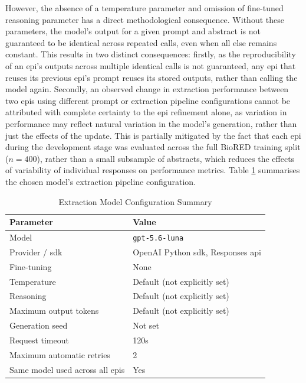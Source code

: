 However, the absence of a temperature parameter and omission of fine-tuned reasoning parameter has a direct methodological consequence. Without these parameters, the model's output for a given prompt and abstract is not guaranteed to be identical across repeated calls, even when all else remains constant. This results in two distinct consequences: firstly, as the reproducibility of an \gls{epi}'s outputs across multiple identical calls is not guaranteed, any \gls{epi} that reuses its previous \gls{epi}'s prompt reuses its stored outputs, rather than calling the model again. Secondly, an observed change in extraction performance between two \gls{epi}s using different prompt or extraction pipeline configurations cannot be attributed with complete certainty to the \gls{epi} refinement alone, as variation in performance may reflect natural variation in the model's generation, rather than just the effects of the update. This is partially mitigated by the fact that each \gls{epi} during the development stage was evaluated across the full BioRED training split ($n = 400$), rather than a small subsample of abstracts, which reduces the effects of variability of individual responses on performance metrics. Table \ref{tab:extraction_model_config_summary} summarises the chosen model's extraction pipeline configuration.

\begin{table}[H]
    \centering
    \caption{Extraction Model Configuration Summary}
    \label{tab:extraction_model_config_summary}
    \begin{tabularx}{\textwidth}{l l}
        \toprule
        Parameter & Value \\
        \midrule
        Model & \verb|gpt-5.6-luna| \\
        Provider / \gls{sdk} & OpenAI Python \gls{sdk}, Responses \gls{api} \\
        Fine-tuning & None \\
        Temperature & Default (not explicitly set) \\
        Reasoning & Default (not explicitly set) \\
        Maximum output tokens & Default (not explicitly set) \\
        Generation seed & Not set \\
        Request timeout & 120s \\
        Maximum automatic retries & 2 \\
        Same model used across all \glspl{epi} & Yes \\
        \bottomrule
    \end{tabularx}
\end{table}

